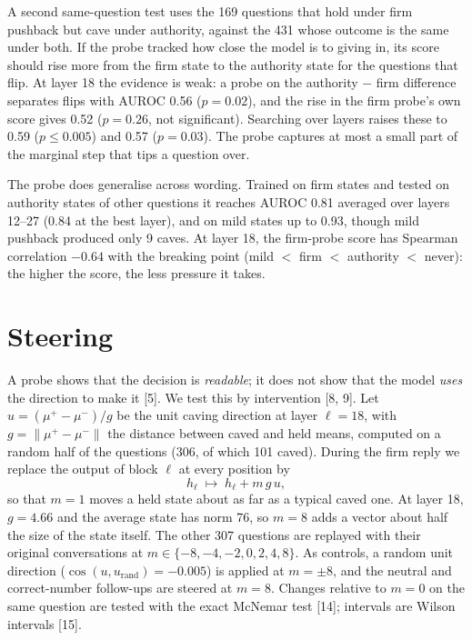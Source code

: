 \documentclass[12pt]{report}
\theoremstyle{definition}
\begin{document}
A second same-question test uses the 169 questions that hold under firm pushback but cave under authority, against the 431 whose outcome is the same under both. If the probe tracked how close the model is to giving in, its score should rise more from the firm state to the authority state for the questions that flip. At layer 18 the evidence is weak: a probe on the authority $-$ firm difference separates flips with AUROC 0.56 ($p = 0.02$), and the rise in the firm probe's own score gives 0.52 ($p = 0.26$, not significant). Searching over layers raises these to 0.59 ($p \le 0.005$) and 0.57 ($p = 0.03$). The probe captures at most a small part of the marginal step that tips a question over.

The probe does generalise across wording. Trained on firm states and tested on authority states of other questions it reaches AUROC 0.81 averaged over layers 12--27 (0.84 at the best layer), and on mild states up to 0.93, though mild pushback produced only 9 caves. At layer 18, the firm-probe score has Spearman correlation $-0.64$ with the breaking point (mild $<$ firm $<$ authority $<$ never): the higher the score, the less pressure it takes.

\chapter{Steering}

A probe shows that the decision is \emph{readable}; it does not show that the model \emph{uses} the direction to make it [5]. We test this by intervention [8, 9]. Let $u = (\mu^+ - \mu^-)/g$ be the unit caving direction at layer $\ell = 18$, with $g = \lVert \mu^+ - \mu^- \rVert$ the distance between caved and held means, computed on a random half of the questions (306, of which 101 caved). During the firm reply we replace the output of block $\ell$ at every position by
\begin{equation}
h_\ell \;\longmapsto\; h_\ell + m\, g\, u, \label{eq:steer}
\end{equation}
so that $m = 1$ moves a held state about as far as a typical caved one. At layer 18, $g = 4.66$ and the average state has norm 76, so $m = 8$ adds a vector about half the size of the state itself. The other 307 questions are replayed with their original conversations at $m \in \{-8, -4, -2, 0, 2, 4, 8\}$. As controls, a random unit direction ($\cos(u, u_{\text{rand}}) = -0.005$) is applied at $m = \pm 8$, and the neutral and correct-number follow-ups are steered at $m = 8$. Changes relative to $m = 0$ on the same question are tested with the exact McNemar test [14]; intervals are Wilson intervals [15].
\end{document}
